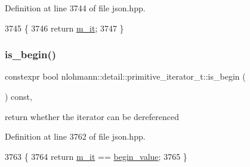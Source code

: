 Definition at line 3744 of file json.\+hpp.


\begin{DoxyCode}
3745     \{
3746         \textcolor{keywordflow}{return} \hyperlink{classnlohmann_1_1detail_1_1primitive__iterator__t_a4357355113b0cd7e12b15c2e93703510}{m\_it};
3747     \}
\end{DoxyCode}
\mbox{\label{classnlohmann_1_1detail_1_1primitive__iterator__t_a8d1a7d46b3fcd06edd034f04ededb5e4}} 
\subsubsection{\texorpdfstring{is\+\_\+begin()}{is\_begin()}}
{\footnotesize\ttfamily constexpr bool nlohmann\+::detail\+::primitive\+\_\+iterator\+\_\+t\+::is\+\_\+begin (\begin{DoxyParamCaption}{ }\end{DoxyParamCaption}) const\hspace{0.3cm}{\ttfamily [inline]}, {\ttfamily [noexcept]}}



return whether the iterator can be dereferenced 



Definition at line 3762 of file json.\+hpp.


\begin{DoxyCode}
3763     \{
3764         \textcolor{keywordflow}{return} \hyperlink{classnlohmann_1_1detail_1_1primitive__iterator__t_a4357355113b0cd7e12b15c2e93703510}{m\_it} == \hyperlink{classnlohmann_1_1detail_1_1primitive__iterator__t_afcb3bcf9da8aa95bd82067d1a67c2326}{begin\_value};
3765     \}
\end{DoxyCode}
\mbox{\label{classnlohmann_1_1detail_1_1primitive__iterator__t_a45a7e301c23b5b90417baf2277f40b1d}} 
